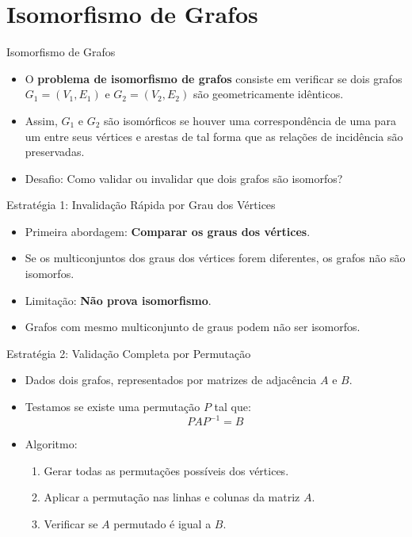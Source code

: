 \documentclass{beamer}
\begin{document}
\section{Isomorfismo de Grafos}

\begin{frame}{Isomorfismo de Grafos}
    \begin{itemize}
        \item O \textbf{problema de isomorfismo de grafos} consiste em verificar se dois grafos $G_1 = (V_1, E_1)$ e $G_2 = (V_2, E_2)$ são geometricamente idênticos.
        \item Assim, $G_1$ e $G_2$ são isomórficos se houver uma correspondência de uma para um entre seus vértices e arestas de tal forma que as relações de incidência são
preservadas.
        \item Desafio: Como validar ou invalidar que dois grafos são isomorfos?
    \end{itemize}
\end{frame}


\begin{frame}{Estratégia 1: Invalidação Rápida por Grau dos Vértices}

\begin{itemize}
    \item Primeira abordagem: \textbf{Comparar os graus dos vértices}.
    \item Se os multiconjuntos dos graus dos vértices forem diferentes, os grafos não são isomorfos.
    \item Limitação: \textbf{Não prova isomorfismo}.
    \item Grafos com mesmo multiconjunto de graus podem não ser isomorfos.
\end{itemize}

\end{frame}

\begin{frame}{Estratégia 2: Validação Completa por Permutação}

\begin{itemize}
    \item Dados dois grafos, representados por matrizes de adjacência $A$ e $B$.
    \item Testamos se existe uma permutação $P$ tal que:
    \[
    P A P^{-1} = B
    \]
    \item Algoritmo:
    \begin{enumerate}
        \item Gerar todas as permutações possíveis dos vértices.
        \item Aplicar a permutação nas linhas e colunas da matriz $A$.
        \item Verificar se $A$ permutado é igual a $B$.
    \end{enumerate}
\end{itemize}

\end{frame}
\end{document}

